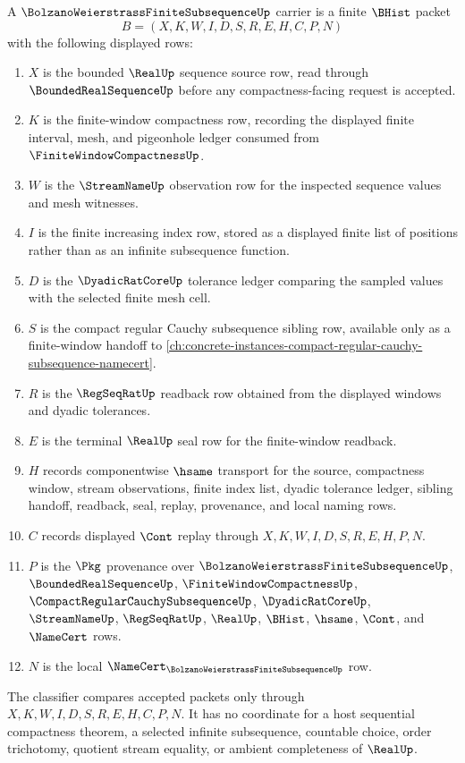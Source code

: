 \begin{definition}
\label{def:bolzano-weierstrass-finite-subsequence-carrier}
A $\BolzanoWeierstrassFiniteSubsequenceUp$ carrier is a finite $\BHist$ packet
$$
B=(X,K,W,I,D,S,R,E,H,C,P,N)
$$
with the following displayed rows:
\begin{enumerate}
\item $X$ is the bounded $\RealUp$ sequence source row, read through $\BoundedRealSequenceUp$ before any compactness-facing request is accepted.
\item $K$ is the finite-window compactness row, recording the displayed finite interval, mesh, and pigeonhole ledger consumed from $\FiniteWindowCompactnessUp$.
\item $W$ is the $\StreamNameUp$ observation row for the inspected sequence values and mesh witnesses.
\item $I$ is the finite increasing index row, stored as a displayed finite list of positions rather than as an infinite subsequence function.
\item $D$ is the $\DyadicRatCoreUp$ tolerance ledger comparing the sampled values with the selected finite mesh cell.
\item $S$ is the compact regular Cauchy subsequence sibling row, available only as a finite-window handoff to \autoref{ch:concrete-instances-compact-regular-cauchy-subsequence-namecert}.
\item $R$ is the $\RegSeqRatUp$ readback row obtained from the displayed windows and dyadic tolerances.
\item $E$ is the terminal $\RealUp$ seal row for the finite-window readback.
\item $H$ records componentwise $\hsame$ transport for the source, compactness window, stream observations, finite index list, dyadic tolerance ledger, sibling handoff, readback, seal, replay, provenance, and local naming rows.
\item $C$ records displayed $\Cont$ replay through $X,K,W,I,D,S,R,E,H,P,N$.
\item $P$ is the $\Pkg$ provenance over $\BolzanoWeierstrassFiniteSubsequenceUp$, $\BoundedRealSequenceUp$, $\FiniteWindowCompactnessUp$, $\CompactRegularCauchySubsequenceUp$, $\DyadicRatCoreUp$, $\StreamNameUp$, $\RegSeqRatUp$, $\RealUp$, $\BHist$, $\hsame$, $\Cont$, and $\NameCert$ rows.
\item $N$ is the local $\NameCert_{\BolzanoWeierstrassFiniteSubsequenceUp}$ row.
\end{enumerate}
The classifier compares accepted packets only through
$X,K,W,I,D,S,R,E,H,C,P,N$. It has no coordinate for a host sequential compactness theorem, a selected infinite subsequence, countable choice, order trichotomy, quotient stream equality, or ambient completeness of $\RealUp$.
\end{definition}

